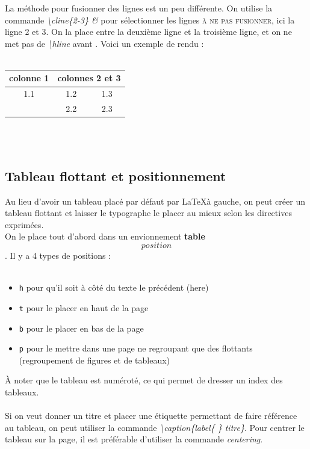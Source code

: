 \documentclass[a4paper, 10pt]{book}
\begin{document}
La méthode pour fusionner des lignes est un peu différente. On utilise la commande \textit{\textbackslash cline\{2-3\} \&} pour sélectionner les lignes \textsc{à ne pas fusionner}, ici la ligne 2 et 3. On la place entre la deuxième ligne et la troisième ligne, et on ne met pas de \textit{\textbackslash hline} avant . Voici un exemple de rendu :\\ \\

\begin{tabular}{|c|c|c|}
\hline colonne 1 & \multicolumn{2}{c|}{colonnes 2 et 3}\\
\hline 1.1 & 1.2 & 1.3 \\
\cline{2-3} & 2.2 & 2.3\\
\hline 
\end{tabular} \\ \\

\subsection{Tableau flottant et positionnement}

Au lieu d'avoir un tableau placé par défaut par \LaTeX à gauche, on peut créer un tableau flottant et laisser le typographe le placer au mieux selon les directives exprimées. \\
On le place tout d'abord dans un envionnement \textbf{table\[position\]}. Il y a 4 types de positions : \\ \\

\begin{itemize}
\item \texttt{h} pour qu'il soit à côté du texte le précédent (here)
\item \texttt{t} pour le placer en haut de la page
\item \texttt{b} pour le placer en bas de la page
\item \texttt{p} pour le mettre dans une page ne regroupant que des flottants (regroupement de figures et de tableaux)\\
\end{itemize}

À noter que le tableau est numéroté, ce qui permet de dresser un index des tableaux.\\ \\

Si on veut donner un titre et placer une étiquette permettant de faire référence au tableau, on peut utiliser la commande \textit{\textbackslash caption\{label\{ \} titre\}}. Pour centrer le tableau sur la page, il est préférable d'utiliser la commande \textit{centering}.
\end{document}
